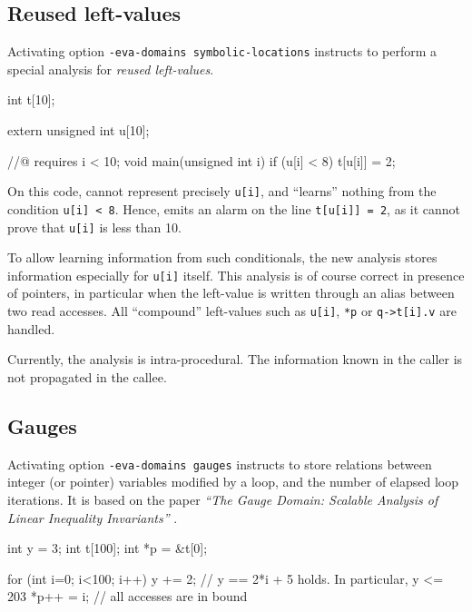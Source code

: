 \documentclass{frama-c-book}
\begin{document}
\subsection{Reused left-values}
\label{sec:reuse}

Activating option \texttt{-eva-domains symbolic-locations} instructs
\Eva{} to perform a special analysis for \emph{reused left-values}.

\begin{listing-nonumber}
int t[10];

extern unsigned int u[10];

//@ requires i < 10;
void main(unsigned int i) {
  if (u[i] < 8) {
    t[u[i]] = 2;
  }
}
\end{listing-nonumber}
On this code, \Eva{} cannot represent precisely \lstinline+u[i]+, and
``learns'' nothing from the condition \lstinline+u[i] < 8+. Hence, \Eva{}
emits an alarm on the line \lstinline|t[u[i]] = 2|, as it cannot prove
that \lstinline+u[i]+ is less than 10.

To allow learning information from such conditionals,
the new analysis stores information especially for \texttt{u[i]} itself.
This analysis is of course correct in presence of pointers, in particular
when the left-value is written through an alias between two read accesses.
All ``compound'' left-values such as \texttt{u[i]}, \texttt{*p} or
\texttt{q->t[i].v} are handled.

Currently, the analysis is intra-procedural. The information known
in the caller is not propagated in the callee.

\subsection{Gauges}
\label{sec:gauges}

Activating option \texttt{-eva-domains gauges} instructs \Eva{} to
store relations between integer (or pointer) variables modified by a
loop, and the number of elapsed loop iterations. It is based on the
paper \emph{``The Gauge Domain: Scalable Analysis of Linear
Inequality Invariants''}
\cite{DBLP:conf/cav/Venet12}.


\begin{listing-nonumber}
int y = 3;
int t[100];
int *p = &t[0];

for (int i=0; i<100; i++) {
  y += 2; // y == 2*i + 5 holds. In particular, y <= 203
  *p++ = i; // all accesses are in bound
}
\end{listing-nonumber}
\end{document}
